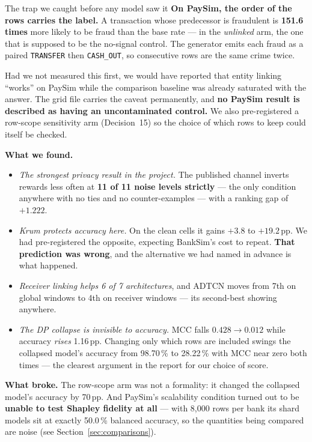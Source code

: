 \documentclass[11pt]{article}
\begin{document}
\begin{warnbox}{The trap we caught before any model saw it}
\textbf{On PaySim, the order of the rows carries the label.} A transaction whose predecessor is fraudulent
is \textbf{151.6 times} more likely to be fraud than the base rate --- in the \emph{unlinked} arm, the one
that is supposed to be the no-signal control. The generator emits each fraud as a paired
\texttt{TRANSFER} then \texttt{CASH\_OUT}, so consecutive rows are the same crime twice.

Had we not measured this first, we would have reported that entity linking ``works'' on PaySim while the
comparison baseline was already saturated with the answer. The grid file carries the caveat permanently,
and \textbf{no PaySim result is described as having an uncontaminated control.} We also pre-registered a
row-scope sensitivity arm (Decision~15) so the choice of which rows to keep could itself be checked.
\end{warnbox}

\textbf{What we found.}
\begin{itemize}\itemsep2pt
  \item \emph{The strongest privacy result in the project.} The published channel inverts rewards less
        often at \textbf{11 of 11 noise levels strictly} --- the only condition anywhere with no ties and
        no counter-examples --- with a ranking gap of $+1.222$.
  \item \emph{Krum \emph{protects} accuracy here.} On the clean cells it gains $+3.8$ to $+19.2$\,pp. We
        had pre-registered the opposite, expecting BankSim's cost to repeat. \textbf{That prediction was
        wrong}, and the alternative we had named in advance is what happened.
  \item \emph{Receiver linking helps 6 of 7 architectures}, and ADTCN moves from 7th on global windows to
        4th on receiver windows --- its second-best showing anywhere.
  \item \emph{The DP collapse is invisible to accuracy.} MCC falls $0.428 \to 0.012$ while accuracy
        \emph{rises} 1.16\,pp. Changing only which rows are included swings the collapsed model's accuracy
        from 98.70\,\% to 28.22\,\% with MCC near zero both times --- the clearest argument in the report
        for our choice of score.
\end{itemize}

\textbf{What broke.} The row-scope arm was not a formality: it changed the collapsed model's accuracy by
70\,pp. And PaySim's scalability condition turned out to be \textbf{unable to test Shapley fidelity at
all} --- with 8{,}000 rows per bank its shard models sit at exactly 50.0\,\% balanced accuracy, so the
quantities being compared are noise (see Section~\ref{sec:comparisons}).
\end{document}
